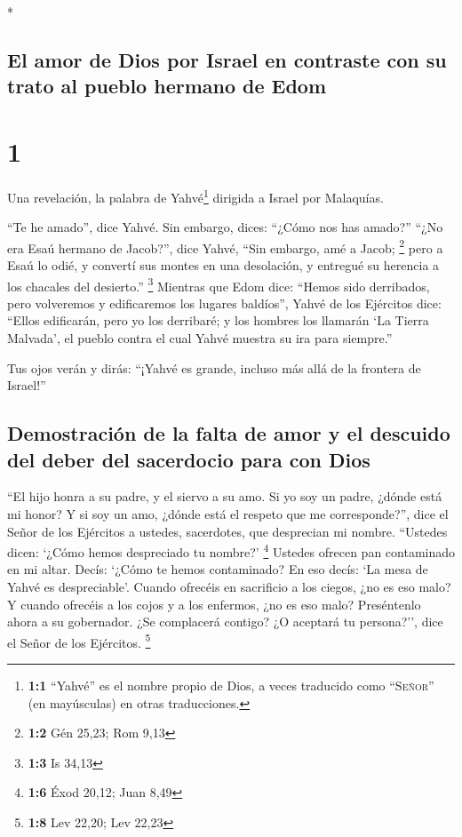 \begin{paracol}{2} \switchcolumn[0]*

\hypertarget{el-amor-de-dios-por-israel-en-contraste-con-su-trato-al-pueblo-hermano-de-edom}{%
\subsection{El amor de Dios por Israel en contraste con su trato al
pueblo hermano de
Edom}\label{el-amor-de-dios-por-israel-en-contraste-con-su-trato-al-pueblo-hermano-de-edom}}

\hypertarget{section}{%
\section{1}\label{section}}

 Una revelación, la palabra de Yahvé\footnote{\textbf{1:1}
  ``Yahvé'' es el nombre propio de Dios, a veces traducido como
  ``\textsc{Señor}'' (en mayúsculas) en otras traducciones.} dirigida a
Israel por Malaquías.

 ``Te he amado'', dice Yahvé. Sin embargo, dices: ``¿Cómo
nos has amado?'' ``¿No era Esaú hermano de Jacob?'', dice Yahvé, ``Sin
embargo, amé a Jacob; \footnote{\textbf{1:2} Gén 25,23; Rom 9,13}
 pero a Esaú lo odié, y convertí sus montes en una
desolación, y entregué su herencia a los chacales del desierto.''
\footnote{\textbf{1:3} Is 34,13}  Mientras que Edom dice:
``Hemos sido derribados, pero volveremos y edificaremos los lugares
baldíos'', Yahvé de los Ejércitos dice: ``Ellos edificarán, pero yo los
derribaré; y los hombres los llamarán `La Tierra Malvada', el pueblo
contra el cual Yahvé muestra su ira para siempre.''

 Tus ojos verán y dirás: ``¡Yahvé es grande, incluso más
allá de la frontera de Israel!''

\hypertarget{demostraciuxf3n-de-la-falta-de-amor-y-el-descuido-del-deber-del-sacerdocio-para-con-dios}{%
\subsection{Demostración de la falta de amor y el descuido del deber del
sacerdocio para con
Dios}\label{demostraciuxf3n-de-la-falta-de-amor-y-el-descuido-del-deber-del-sacerdocio-para-con-dios}}

 ``El hijo honra a su padre, y el siervo a su amo. Si yo
soy un padre, ¿dónde está mi honor? Y si soy un amo, ¿dónde está el
respeto que me corresponde?'', dice el Señor de los Ejércitos a ustedes,
sacerdotes, que desprecian mi nombre. ``Ustedes dicen: `¿Cómo hemos
despreciado tu nombre?' \footnote{\textbf{1:6} Éxod 20,12; Juan 8,49}
 Ustedes ofrecen pan contaminado en mi altar. Decís:
`¿Cómo te hemos contaminado? En eso decís: `La mesa de Yahvé es
despreciable'.  Cuando ofrecéis en sacrificio a los
ciegos, ¿no es eso malo? Y cuando ofrecéis a los cojos y a los enfermos,
¿no es eso malo? Preséntenlo ahora a su gobernador. ¿Se complacerá
contigo? ¿O aceptará tu persona?'', dice el Señor de los Ejércitos.
\footnote{\textbf{1:8} Lev 22,20; Lev 22,23}


\end{paracol}
